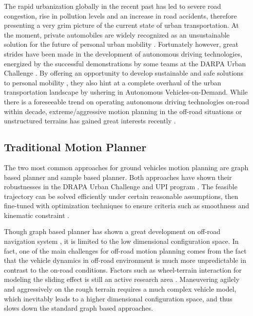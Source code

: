 \documentclass[../thesis.tex]{subfiles}
\begin{document}
The rapid urbanization globally in the recent past has led to severe road congestion, rise in pollution levels and an increase in road accidents, therefore presenting a very grim picture of the current state of urban transportation. 
At the moment, private automobiles are widely recognized as an unsustainable solution for the future of personal urban mobility \cite{reinventing}. 
Fortunately however, great strides have been made in the development of autonomous driving technologies, energized by the successful demonstrations by some teams at the DARPA Urban Challenge \cite{boss, multimodaltartan}. 
By offering an opportunity to develop sustainable and safe solutions to personal mobility \cite{usecases_of_AD}, they also hint at a complete overhaul of the urban transportation landscape by ushering in Autonomous Vehicles-on-Demand. 
While there is a foreseeable trend on operating autonomous driving technologies on-road within decade, extreme/aggressive motion planning in the off-road situations or unstructured terrains has gained great interests recently \cite{kolter2010probabilistic,williams2016aggressive,gray2012predictive,cutler2016autonomous,cutler2014reinforcement}. 

\subsection{Traditional Motion Planner}


The two most common approaches for ground vehicles motion planning are graph based planner and sample based planner. 
Both approaches have shown their robustnesses in the DRAPA Urban Challenge \cite{koenig2002d,kuwata2008motion} and UPI program \cite{kelly2006toward,stentz2007crusher}. The feasible trajectory can be solved efficiently under certain reasonable assumptions, then fine-tuned with optimization techniques to ensure criteria such as smoothness and kinematic constraint \cite{dolgov2008practical}.


Though graph based planner has shown a great development on off-road navigation system \cite{kelly2006toward,stentz2007crusher}, it is limited to the low dimensional configuration space.
In fact, one of the main challenges for off-road motion planning comes from the fact that the vehicle dynamics in off-road environment is much more unpredictable in contrast to the on-road conditions. 
Factors such as wheel-terrain interaction for modeling the sliding effect is still an active research area \cite{shibly2005equivalent,rubinstein2004detailed}. 
Maneuvering agilely and aggressively on the rough terrain requires a much complex vehicle model, which inevitably leads to a higher dimensional configuration space, and thus slows down the standard graph based approaches. 
\end{document}
